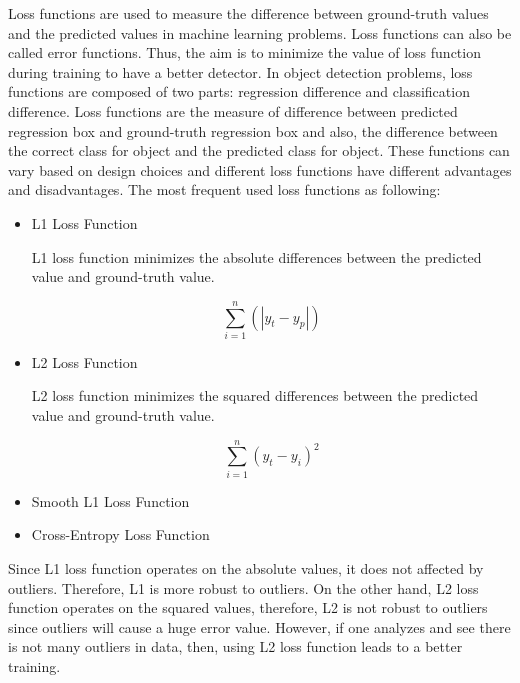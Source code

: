 \documentclass{article}
\begin{document}
\setlength{\parindent}{6ex}

\indent

Loss functions are used to measure the difference between ground-truth 
values and the predicted values in machine learning problems. Loss 
functions can also be called error functions. Thus, the aim is to minimize 
the value of loss function during training to have a better detector. 
In object detection problems, loss functions are composed of two parts: 
regression difference and classification difference. Loss functions are 
the measure of difference between predicted regression box and 
ground-truth regression box and also, the difference between the correct 
class for object and the predicted class for object. These functions can 
vary based on design choices and different loss functions have different 
advantages and disadvantages. The most frequent used loss functions as 
following:
\begin{itemize}
    \item L1 Loss Function
    
    L1 loss function minimizes the absolute differences between the
    predicted value and ground-truth value.

    $$\sum_{i=1}^{n} (|y_t - y_p|)$$

    \item L2 Loss Function
    
    L2 loss function minimizes the squared differences between the 
    predicted value and ground-truth value.

    $$\sum_{i=1}^{n} (y_t - y_i)^{2}$$

    \item Smooth L1 Loss Function
    

    \item Cross-Entropy Loss Function
\end{itemize}    
\indent

Since L1 loss function operates on the absolute values, it does not 
affected by outliers. Therefore, L1 is more robust to outliers. On the
other hand, L2 loss function operates on the squared values, therefore, 
L2 is not robust to outliers since outliers will cause a huge error value. 
However, if one analyzes and see there is not many outliers in data, then, 
using L2 loss function leads to a better training.
\end{document}
